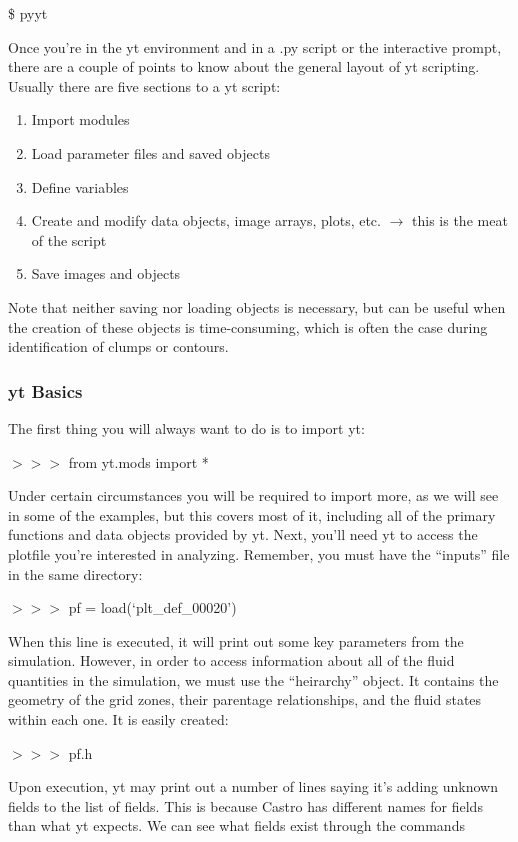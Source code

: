 \$ pyyt

Once you're in the yt environment and in a .py script or the interactive prompt, there are a couple of points to know about the general layout of yt scripting. Usually there are five sections to a yt script:
\begin{enumerate}
\item
\indent Import modules
\item
\indent Load parameter files and saved objects
\item
\indent Define variables
\item
\indent Create and modify data objects, image arrays, plots, etc. $\rightarrow$ this is the meat of the script
\item
\indent Save images and objects
\end{enumerate}

Note that neither saving nor loading objects is necessary, but can be useful when the creation of these objects is time-consuming, which is often the case during identification of clumps or contours.

\subsubsection{yt Basics}

The first thing you will always want to do is to import yt:

{{\scriptsize$>>>$}} from yt.mods import *

Under certain circumstances you will be required to import more, as we will see in some of the examples, but this covers most of it, including all of the primary functions and data objects provided by yt. Next, you'll need yt to access the plotfile you're interested in analyzing. Remember, you must have the ``inputs'' file in the same directory:

{\scriptsize$>>>$} pf = load(`plt\_def\_00020')

When this line is executed, it will print out some key parameters from the simulation. However, in order to access information about all of the fluid quantities in the simulation, we must use the ``heirarchy'' object. It contains the geometry of the grid zones, their parentage relationships, and the fluid states within each one. It is easily created:

{\scriptsize$>>>$} pf.h

Upon execution, yt may print out a number of lines saying it's adding unknown fields to the list of fields. This is because Castro has different names for fields than what yt expects. We can see what fields exist through the commands

